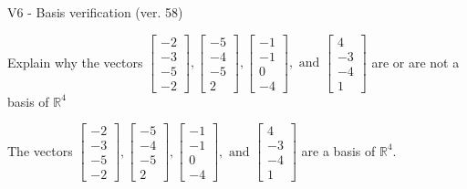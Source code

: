 \begin{exercise}
  \begin{exerciseTitle}V6 - Basis verification (ver. 58)\end{exerciseTitle}
  \begin{exerciseStatement}
    Explain why the vectors \(\left[\begin{array}{r}
-2 \\
-3 \\
-5 \\
-2
\end{array}\right] , \left[\begin{array}{r}
-5 \\
-4 \\
-5 \\
2
\end{array}\right] , \left[\begin{array}{r}
-1 \\
-1 \\
0 \\
-4
\end{array}\right] , \text{ and } \left[\begin{array}{r}
4 \\
-3 \\
-4 \\
1
\end{array}\right]\) are or are not a basis of \(\mathbb{R}^4\)	


  \end{exerciseStatement}
  \begin{exerciseAnswer}
   The vectors \(\left[\begin{array}{r}
-2 \\
-3 \\
-5 \\
-2
\end{array}\right] , \left[\begin{array}{r}
-5 \\
-4 \\
-5 \\
2
\end{array}\right] , \left[\begin{array}{r}
-1 \\
-1 \\
0 \\
-4
\end{array}\right] , \text{ and } \left[\begin{array}{r}
4 \\
-3 \\
-4 \\
1
\end{array}\right]\) 
  	 are  a basis of \(\mathbb{R}^4\).
  


  \end{exerciseAnswer}
\end{exercise}